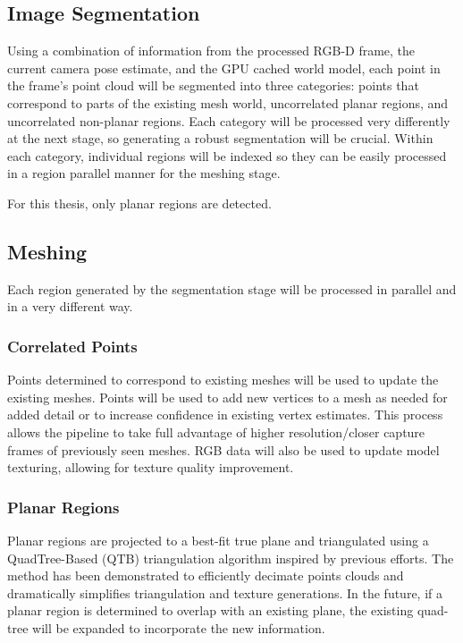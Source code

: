 \subsection{Image Segmentation}
Using a combination of information from the processed RGB-D frame, the current camera pose estimate, and the GPU cached world model, each point in the frame's point cloud will be segmented into three categories: points that correspond to parts of the existing mesh world, uncorrelated planar regions, and uncorrelated non-planar regions. Each category will be processed very differently at the next stage, so generating a robust segmentation will be crucial. Within each category, individual regions will be indexed so they can be easily processed in a region parallel manner for the meshing stage.\par
For this thesis, only planar regions are detected.

\subsection{Meshing}
Each region generated by the segmentation stage will be processed in parallel and in a very different way.
\subsubsection{Correlated Points}
Points determined to correspond to existing meshes will be used to update the existing meshes. Points will be used to add new vertices to a mesh as needed for added detail or to increase confidence in existing vertex estimates. This process allows the pipeline to take full advantage of higher resolution/closer capture frames of previously seen meshes. RGB data will also be used to update model texturing, allowing for texture quality improvement.

\subsubsection{Planar Regions}
Planar regions are projected to a best-fit true plane and triangulated using a QuadTree-Based (QTB) triangulation algorithm inspired by previous efforts\cite{planesegmentationQTB,ma2013planar}. The method has been demonstrated to efficiently decimate points clouds and dramatically simplifies triangulation and texture generations. In the future, if a planar region is determined to overlap with an existing plane, the existing quad-tree will be expanded to incorporate the new information.

